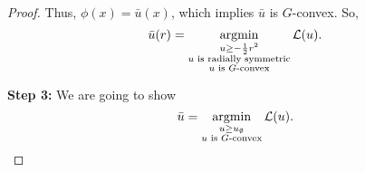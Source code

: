 \begin{proof}
	Thus, $\phi(x) = \bar{u}(x)$, which implies $\bar{u}$ is $G$-convex. So,
	\begin{equation*}
	\bar{u}(r)= \argmin\limits_{\substack{u\ge -\frac{1}{2}r^2 \\ u \text{ is radially symmetric} \\ u \text{ is $G$-convex}}} \mathcal{L}(u).
	\end{equation*}\medskip
	
	{\bf Step 3:} We are going to show
	\begin{equation*}
	\bar{u}=\argmin\limits_{\substack{u\ge u_{\emptyset} \\ u \text{ is $G$-convex}}} \mathcal{L}(u) .
	\end{equation*}


\end{proof}
